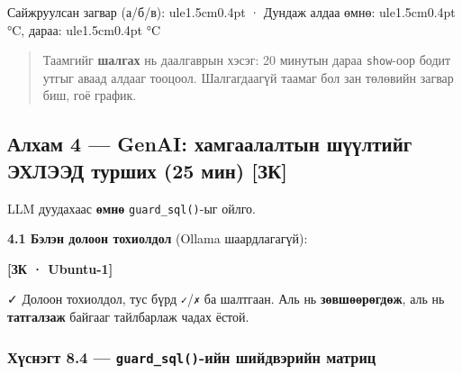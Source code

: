 Сайжруулсан загвар (а/б/в): ule{1.5cm}{0.4pt} · Дундаж алдаа өмнө: ule{1.5cm}{0.4pt} °C, дараа: ule{1.5cm}{0.4pt} °C

\begin{quote}
Таамгийг \textbf{шалгах} нь даалгаврын хэсэг: 20 минутын дараа \texttt{show}-оор бодит утгыг аваад алдааг тооцоол. Шалгагдаагүй таамаг бол зан төлөвийн загвар биш, гоё график.
\end{quote}

\hypertarget{ux430ux43bux445ux430ux43c-4-genai-ux445ux430ux43cux433ux430ux430ux43bux430ux43bux442ux44bux43d-ux448ux4afux4afux43bux442ux438ux439ux433-ux44dux445ux43bux44dux44dux434-ux442ux443ux440ux448ux438ux445-25-ux43cux438ux43d-ux437ux43a}{%
\subsection{Алхам 4 --- GenAI: хамгаалалтын шүүлтийг ЭХЛЭЭД турших (25 мин) {[}ЗК{]}}\label{ux430ux43bux445ux430ux43c-4-genai-ux445ux430ux43cux433ux430ux430ux43bux430ux43bux442ux44bux43d-ux448ux4afux4afux43bux442ux438ux439ux433-ux44dux445ux43bux44dux44dux434-ux442ux443ux440ux448ux438ux445-25-ux43cux438ux43d-ux437ux43a}}

LLM дуудахаас \textbf{өмнө} \texttt{guard\_sql()}-ыг ойлго.

\textbf{4.1 Бэлэн долоон тохиолдол} (Ollama шаардлагагүй):

\textbf{{[}ЗК · Ubuntu-1{]}}

\begin{Shaded}
\begin{Highlighting}[]
 \KeywordTok{|} 
\end{Highlighting}
\end{Shaded}

✓ Долоон тохиолдол, тус бүрд \texttt{✓}/\allowbreak\texttt{✗} ба шалтгаан. Аль нь \textbf{зөвшөөрөгдөж}, аль нь \textbf{татгалзаж} байгааг тайлбарлаж чадах ёстой.

\hypertarget{ux445ux4afux441ux43dux44dux433ux442-8.4-guard_sql-ux438ux439ux43d-ux448ux438ux439ux434ux432ux44dux440ux438ux439ux43d-ux43cux430ux442ux440ux438ux446}{%
\subsubsection{\texorpdfstring{Хүснэгт 8.4 --- \texttt{guard\_sql()}-ийн шийдвэрийн матриц}{Хүснэгт 8.4 --- guard\_sql()-ийн шийдвэрийн матриц}}\label{ux445ux4afux441ux43dux44dux433ux442-8.4-guard_sql-ux438ux439ux43d-ux448ux438ux439ux434ux432ux44dux440ux438ux439ux43d-ux43cux430ux442ux440ux438ux446}}

